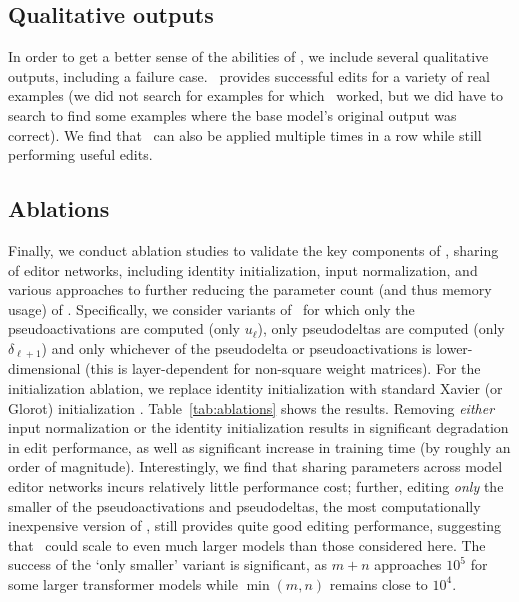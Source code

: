 \documentclass{article}
\begin{document}


\subsection{Qualitative outputs}
In order to get a better sense of the abilities of \name, we include several qualitative outputs, including a failure case. \name~provides successful edits for a variety of real examples (we did not search for examples for which \name~worked, but we did have to search to find some examples where the base model's original output was correct). We find that \name~can also be applied multiple times in a row while still performing useful edits.




\subsection{Ablations}
\label{sec:ablations}
Finally, we conduct ablation studies to validate the key components of \name, sharing of editor networks, including identity initialization, input normalization, and various approaches to further reducing the parameter count (and thus memory usage) of \name. Specifically, we consider variants of \name~for which only the pseudoactivations are computed (only $u_\ell$), only pseudodeltas are computed (only $\delta_{\ell+1}$) and only whichever of the pseudodelta or pseudoactivations is lower-dimensional (this is layer-dependent for non-square weight matrices). For the initialization ablation, we replace identity initialization with standard Xavier (or Glorot) initialization \citep{pmlr-v9-glorot10a}. Table~\ref{tab:ablations} shows the results. Removing \textit{either} input normalization or the identity initialization results in significant degradation in edit performance, as well as significant increase in training time (by roughly an order of magnitude). Interestingly, we find that sharing parameters across model editor networks incurs relatively little performance cost; further, editing \textit{only} the smaller of the pseudoactivations and pseudodeltas, the most computationally inexpensive version of \name, still provides quite good editing performance, suggesting that \name~could scale to even much larger models than those considered here. The success of the `only smaller' variant is significant, as $m+n$ approaches $10^5$ for some larger transformer models \citep{brown2020language} while $\min(m,n)$ remains close to $10^4$.
\end{document}
